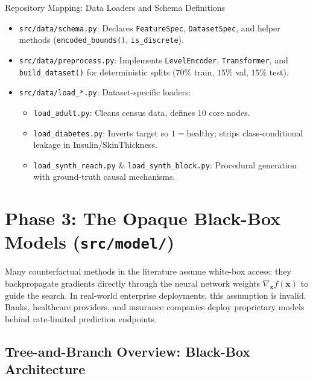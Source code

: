 \documentclass[11pt,a4paper]{article}
\begin{document}
\begin{codeanatomy}{Repository Mapping: Data Loaders and Schema Definitions}
\begin{itemize}[leftmargin=1.2em]
    \item \texttt{src/data/schema.py}: Declares \texttt{FeatureSpec}, \texttt{DatasetSpec}, and helper methods (\texttt{encoded\_bounds()}, \texttt{is\_discrete}).
    \item \texttt{src/data/preprocess.py}: Implements \texttt{LevelEncoder}, \texttt{Transformer}, and \texttt{build\_dataset()} for deterministic splits ($70\%$ train, $15\%$ val, $15\%$ test).
    \item \texttt{src/data/load\_*.py}: Dataset-specific loaders:
    \begin{itemize}
        \item \texttt{load\_adult.py}: Cleans census data, defines 10 core nodes.
        \item \texttt{load\_diabetes.py}: Inverts target so $1 = \text{healthy}$; strips class-conditional leakage in Insulin/SkinThickness.
        \item \texttt{load\_synth\_reach.py} \& \texttt{load\_synth\_block.py}: Procedural generation with ground-truth causal mechanisms.
    \end{itemize}
\end{itemize}
\end{codeanatomy}

\newpage
\section{Phase 3: The Opaque Black-Box Models (\texttt{src/model/})}
\label{sec:phase3}

Many counterfactual methods in the literature assume white-box access: they backpropagate gradients directly through the neural network weights $\nabla_{\mathbf{x}} f(\mathbf{x})$ to guide the search. In real-world enterprise deployments, this assumption is invalid. Banks, healthcare providers, and insurance companies deploy proprietary models behind rate-limited prediction endpoints.

\subsection{Tree-and-Branch Overview: Black-Box Architecture}
\end{document}
